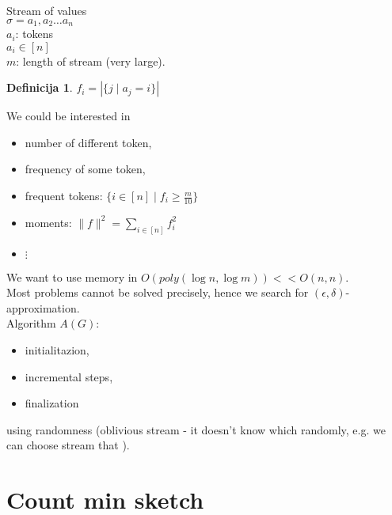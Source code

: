 \documentclass[a4paper, 12pt]{book}
\theoremstyle{definition}
\newtheorem{defn}[counter]{Definicija}
\theoremstyle{remark}
\begin{document}
Stream of values \\
$\sigma = a_1, a_2 \dots a_n$ \\
$a_i$: tokens \\
$a_i \in [n]$ \\
$m$: length of stream (very large).
\begin{defn}
  $f_i = \left| \{j \mid a_j = i\} \right|$
\end{defn}
We could be interested in
\begin{itemize}
  \item number of different token,
  \item frequency of some token,
  \item frequent tokens: $\{i \in [n] \mid f_i \geq \frac{m}{10}\}$
  \item moments: $\lVert f \rVert^2 = \sum_{i \in [n]} f_i^2$
  \item $\vdots$
\end{itemize}
We want to use memory in $O(poly(\log n, \log m)) << O(n, n)$. \\
Most problems cannot be solved precisely, hence we search for $(\epsilon, \delta)$-approximation. \\
Algorithm $A(G)$:
\begin{itemize}
  \item initialitazion,
  \item incremental steps,
  \item finalization
\end{itemize}
using randomness (oblivious stream - it doesn't know which randomly,
e.g. we can choose stream that ).


\section{Count min sketch}
\end{document}
